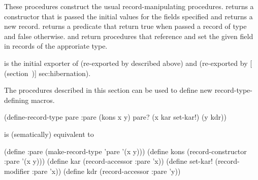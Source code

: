\begin{protos}
\end{protos}
\noindent

\begin{protos}
\end{protos}
\noindent
These procedures construct the usual record-manipulating procedures.
 returns a constructor that is passed the initial
 values for the fields specified and returns a new record.
 returns a predicate that return true when passed
 a record of type  and false otherwise.
 and  return procedures that
 reference and set the given field in records of the approriate type.

\begin{protos}
\end{protos}
\noindent
\noindent {} is the initial exporter of
 (re-exported by  described above)
 and
 (re-exported by
       [ (section~\Ref{})]
       {sec:hibernation}).

The procedures described in this section can be used to define new
 record-type-defining macros.
\begin{example}
(define-record-type pare :pare
  (kons x y)
  pare?
  (x kar set-kar!)
  (y kdr))
\end{example}
is (sematically) equivalent to
\begin{example}
(define :pare (make-record-type 'pare '(x y)))
(define kons (record-constructor :pare '(x y)))
(define kar (record-accessor :pare 'x))
(define set-kar! (record-modifier :pare 'x))
(define kdr (record-accessor :pare 'y))
\end{example}

